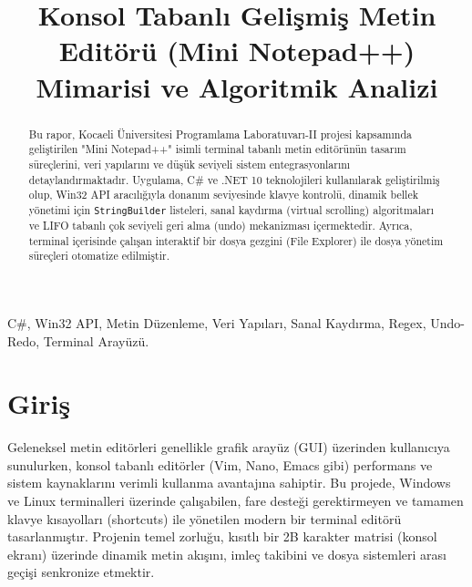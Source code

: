 \documentclass[12pt, conference]{IEEEtran}
\begin{document}
\title{Konsol Tabanlı Gelişmiş Metin Editörü (Mini Notepad++) Mimarisi ve Algoritmik Analizi}

\author{
    \and
}

\maketitle

\begin{abstract}
Bu rapor, Kocaeli Üniversitesi Programlama Laboratuvarı-II projesi kapsamında geliştirilen "Mini Notepad++" isimli terminal tabanlı metin editörünün tasarım süreçlerini, veri yapılarını ve düşük seviyeli sistem entegrasyonlarını detaylandırmaktadır. Uygulama, C\# ve .NET 10 teknolojileri kullanılarak geliştirilmiş olup, Win32 API aracılığıyla donanım seviyesinde klavye kontrolü, dinamik bellek yönetimi için \texttt{StringBuilder} listeleri, sanal kaydırma (virtual scrolling) algoritmaları ve LIFO tabanlı çok seviyeli geri alma (undo) mekanizması içermektedir. Ayrıca, terminal içerisinde çalışan interaktif bir dosya gezgini (File Explorer) ile dosya yönetim süreçleri otomatize edilmiştir.
\end{abstract}

\begin{IEEEkeywords}
C\#, Win32 API, Metin Düzenleme, Veri Yapıları, Sanal Kaydırma, Regex, Undo-Redo, Terminal Arayüzü.
\end{IEEEkeywords}

\section{Giriş}
Geleneksel metin editörleri genellikle grafik arayüz (GUI) üzerinden kullanıcıya sunulurken, konsol tabanlı editörler (Vim, Nano, Emacs gibi) performans ve sistem kaynaklarını verimli kullanma avantajına sahiptir. Bu projede, Windows ve Linux terminalleri üzerinde çalışabilen, fare desteği gerektirmeyen ve tamamen klavye kısayolları (shortcuts) ile yönetilen modern bir terminal editörü tasarlanmıştır. Projenin temel zorluğu, kısıtlı bir 2B karakter matrisi (konsol ekranı) üzerinde dinamik metin akışını, imleç takibini ve dosya sistemleri arası geçişi senkronize etmektir.
\end{document}
